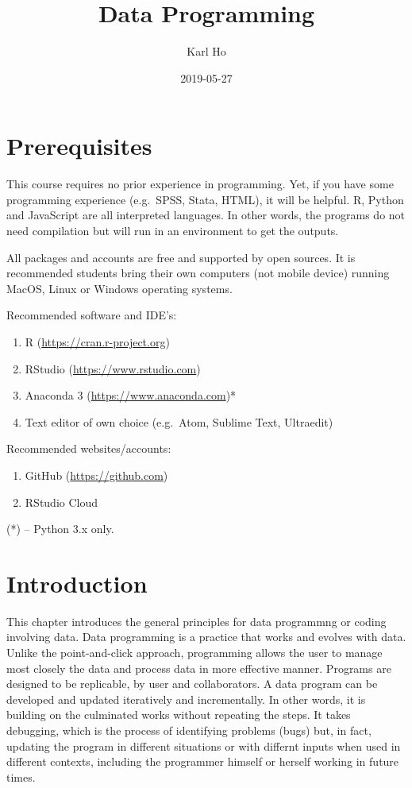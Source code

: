 \documentclass[]{book}
\title{Data Programming}
\author{Karl Ho}
\date{2019-05-27}
\providecommand{\tightlist}{%
  \setlength{\itemsep}{0pt}\setlength{\parskip}{0pt}}
\begin{document}
\maketitle

{
\setcounter{tocdepth}{1}
\tableofcontents
}
\hypertarget{prerequisites}{%
\chapter{Prerequisites}\label{prerequisites}}

This course requires no prior experience in programming. Yet, if you have some programming experience (e.g.~SPSS, Stata, HTML), it will be helpful. R, Python and JavaScript are all interpreted languages. In other words, the programs do not need compilation but will run in an environment to get the outputs.

All packages and accounts are free and supported by open sources. It is recommended students bring their own computers (not mobile device) running MacOS, Linux or Windows operating systems.

Recommended software and IDE's:

\begin{enumerate}
\def\labelenumi{\arabic{enumi}.}
\tightlist
\item
  R (\url{https://cran.r-project.org})
\item
  RStudio (\url{https://www.rstudio.com})
\item
  Anaconda 3 (\url{https://www.anaconda.com})*
\item
  Text editor of own choice (e.g.~Atom, Sublime Text, Ultraedit)
\end{enumerate}

Recommended websites/accounts:

\begin{enumerate}
\def\labelenumi{\arabic{enumi}.}
\tightlist
\item
  GitHub (\url{https://github.com})
\item
  RStudio Cloud
\end{enumerate}

(*) -- Python 3.x only.

\hypertarget{intro}{%
\chapter{Introduction}\label{intro}}

This chapter introduces the general principles for data programmng or coding involving data. Data programming is a practice that works and evolves with data. Unlike the point-and-click approach, programming allows the user to manage most closely the data and process data in more effective manner. Programs are designed to be replicable, by user and collaborators. A data program can be developed and updated iteratively and incrementally. In other words, it is building on the culminated works without repeating the steps. It takes debugging, which is the process of identifying problems (bugs) but, in fact, updating the program in different situations or with differnt inputs when used in different contexts, including the programmer himself or herself working in future times.
\end{document}
